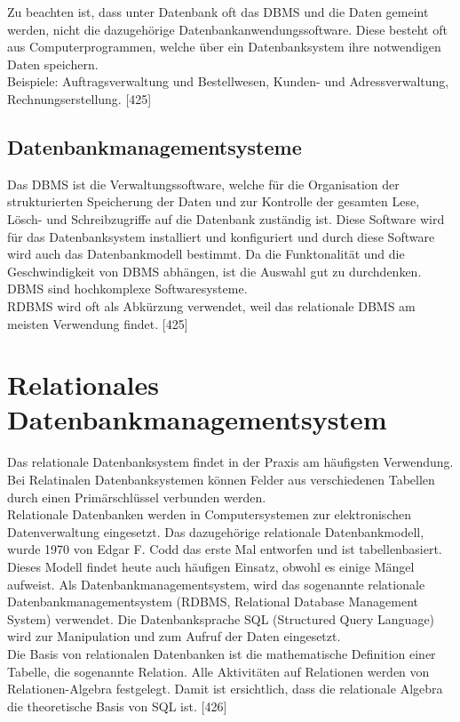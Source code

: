 \documentclass[12pt,a4paper]{report}
\begin{document}
\begin{onehalfspace}
Zu beachten ist, dass unter Datenbank oft das DBMS und die Daten gemeint werden, nicht die dazugehörige Datenbankanwendungssoftware. Diese besteht oft aus Computerprogrammen, welche über ein Datenbanksystem ihre notwendigen Daten speichern.
\\Beispiele: Auftragsverwaltung und Bestellwesen, Kunden- und Adressverwaltung, Rechnungserstellung. [425]

\subsection{Datenbankmanagementsysteme}
Das DBMS ist die Verwaltungssoftware, welche für die Organisation der strukturierten  Speicherung der Daten und zur Kontrolle der gesamten Lese, Lösch- und Schreibzugriffe auf die Datenbank zuständig ist.
Diese Software wird für das Datenbanksystem installiert und konfiguriert und durch diese Software wird auch das Datenbankmodell bestimmt.
Da die Funktonalität und die Geschwindigkeit von DBMS abhängen, ist die Auswahl gut zu durchdenken.
DBMS sind hochkomplexe Softwaresysteme.\\

RDBMS wird oft als Abkürzung verwendet, weil das relationale DBMS am meisten Verwendung findet. [425]

\section{Relationales Datenbankmanagementsystem}
Das relationale Datenbanksystem findet in der Praxis am häufigsten Verwendung.
Bei Relatinalen Datenbanksystemen können Felder aus verschiedenen Tabellen durch einen Primärschlüssel verbunden werden.\\

Relationale Datenbanken werden in Computersystemen zur elektronischen Datenverwaltung eingesetzt. Das dazugehörige relationale Datenbankmodell, wurde 1970 von Edgar F. Codd das erste Mal entworfen und ist tabellenbasiert. Dieses Modell findet heute auch häufigen Einsatz, obwohl es einige Mängel aufweist. Als Datenbankmanagementsystem, wird das sogenannte relationale Datenbankmanagementsystem (RDBMS, Relational Database Management System) verwendet. Die Datenbanksprache SQL (Structured Query Language) wird zur Manipulation und zum Aufruf der Daten eingesetzt.\\

Die Basis von relationalen Datenbanken ist die mathematische Definition einer Tabelle, die sogenannte Relation. Alle Aktivitäten auf Relationen werden von Relationen-Algebra festgelegt. Damit ist ersichtlich, dass die relationale Algebra die theoretische Basis von SQL ist. [426]


\end{onehalfspace}
\end{document}
